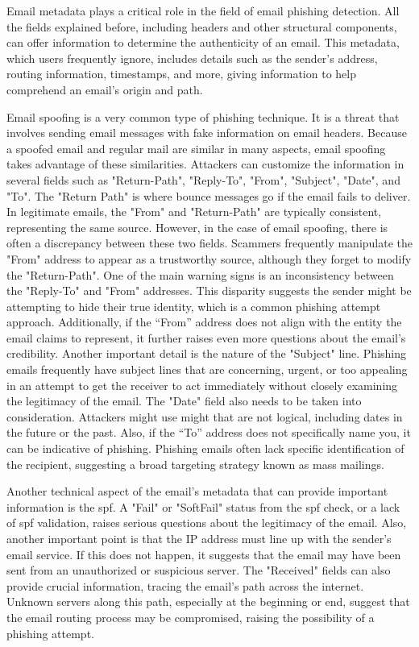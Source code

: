 Email metadata plays a critical role in the field of email phishing detection. All the fields explained before, including headers and other structural components, can offer information to determine the authenticity of an email. This metadata, which users frequently ignore, includes details such as the sender's address, routing information, timestamps, and more, giving information to help comprehend an email's origin and path.

Email spoofing is a very common type of phishing technique. It is a threat that involves sending email messages with fake information on email headers. Because a spoofed email and regular mail are similar in many aspects, email spoofing takes advantage of these similarities. Attackers can customize the information in several fields such as "Return-Path", "Reply-To", "From", "Subject", "Date", and "To".
The "Return Path" is where bounce messages go if the email fails to deliver. In legitimate emails, the "From" and "Return-Path" are typically consistent, representing the same source. However, in the case of email spoofing, there is often a discrepancy between these two fields. Scammers frequently manipulate the "From" address to appear as a trustworthy source, although they forget to modify the "Return-Path".
One of the main warning signs is an inconsistency between the "Reply-To" and "From" addresses. This disparity suggests the sender might be attempting to hide their true identity, which is a common phishing attempt approach. Additionally, if the “From” address does not align with the entity the email claims to represent, it further raises even more questions about the email's credibility. 
Another important detail is the nature of the "Subject" line. Phishing emails frequently have subject lines that are concerning, urgent, or too appealing in an attempt to get the receiver to act immediately without closely examining the legitimacy of the email. 
The "Date" field also needs to be taken into consideration. Attackers might use might that are not logical, including dates in the future or the past. Also, if the “To” address does not specifically name you, it can be indicative of phishing. Phishing emails often lack specific identification of the recipient, suggesting a broad targeting strategy known as mass mailings.

Another technical aspect of the email's metadata that can provide important information is the \ac{spf}. A "Fail" or "SoftFail" status from the \ac{spf} check, or a lack of \ac{spf} validation, raises serious questions about the legitimacy of the email. Also, another important point is that the IP address must line up with the sender's email service. If this does not happen, it suggests that the email may have been sent from an unauthorized or suspicious server. The "Received" fields can also provide crucial information, tracing the email's path across the internet. Unknown servers along this path, especially at the beginning or end, suggest that the email routing process may be compromised, raising the possibility of a phishing attempt.\\

